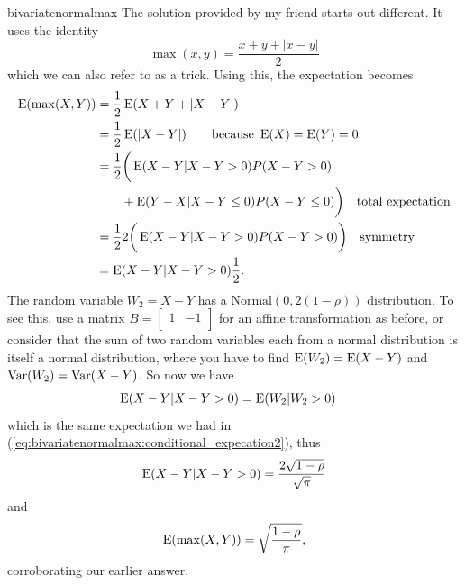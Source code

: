 \begin{answer}{bivariatenormalmax}
The solution provided by my friend starts out different.
It uses the identity
\[
  \max(x,y) = \frac{x + y + |x-y|}{2}
\]
which we can also refer to as a trick.
Using this, the expectation becomes
\begin{align*}
  \operatorname{\mathrm{E}}(\max(X,Y))
  &= \frac{1}{2}\operatorname{\mathrm{E}}(X + Y + |X-Y|) \\
  &= \frac{1}{2}\operatorname{\mathrm{E}}(|X-Y|) \qquad \text{because } \operatorname{\mathrm{E}}(X) = \operatorname{\mathrm{E}}(Y) = 0 \\
  &= \frac{1}{2}
  \bigg(
     \operatorname{\mathrm{E}}(X-Y |X-Y > 0 ) P(X-Y > 0)  \\
  &\qquad + \operatorname{\mathrm{E}}(Y-X |X-Y \leq 0 ) P(X-Y \leq 0)
  \bigg) \quad \text{total expectation} \\
  &= \frac{1}{2} 2
    \bigg(
      \operatorname{\mathrm{E}}(X-Y |X-Y > 0 ) P(X-Y > 0)
    \bigg) \quad \text{symmetry} \\
  &=
    \operatorname{\mathrm{E}}(X-Y |X-Y > 0 ) \frac{1}{2}
\text{.}
\end{align*}
The random variable $W_2 = X-Y$ has a $\text{Normal}(0, 2(1-\rho))$ distribution.
To see this, use a matrix $B=
\begin{bmatrix}
        1 &    -1 \\
\end{bmatrix}
$ for an affine transformation as before, or consider that the sum of two random variables each from a normal distribution is itself a normal distribution, where you have to find
$\operatorname{\mathrm{E}}(W_2) = \operatorname{\mathrm{E}}(X-Y)$
and
$\operatorname{\mathrm{Var}}(W_2) = \operatorname{\mathrm{Var}}(X-Y)$.
So now we have
\begin{align*}
\operatorname{\mathrm{E}}(X-Y|X-Y > 0) &=  \operatorname{\mathrm{E}}(W_2|W_2 > 0)
\end{align*}
which is the same expectation we had in (\ref{eq:bivariatenormalmax:conditional_expecation2}), thus
\begin{align*}
\operatorname{\mathrm{E}}(X-Y|X-Y > 0) =
 \frac{ 2 \sqrt{ 1- \rho}  }{ \sqrt{ \pi} }
\end{align*}
and
\[
\operatorname{\mathrm{E}}(\max(X, Y)) = \sqrt{\frac{  1- \rho  }{  \pi }}
\text{,}
\]
corroborating our earlier answer.

\end{answer}

